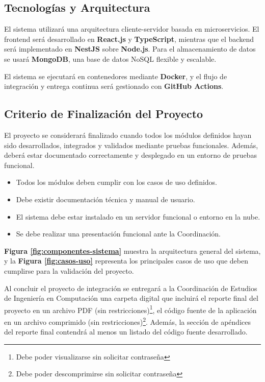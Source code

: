\subsection{Tecnologías y Arquitectura}

El sistema utilizará una arquitectura cliente-servidor basada en microservicios. El frontend será desarrollado en \textbf{React.js} y \textbf{TypeScript}, mientras que el backend será implementado en \textbf{NestJS} sobre \textbf{Node.js}. Para el almacenamiento de datos se usará \textbf{MongoDB}, una base de datos NoSQL flexible y escalable.

El sistema se ejecutará en contenedores mediante \textbf{Docker}, y el flujo de integración y entrega continua será gestionado con \textbf{GitHub Actions}.

\subsection{Criterio de Finalización del Proyecto}

El proyecto se considerará finalizado cuando todos los módulos definidos hayan sido desarrollados, integrados y validados mediante pruebas funcionales. Además, deberá estar documentado correctamente y desplegado en un entorno de pruebas funcional.

\begin{itemize}
	\item Todos los módulos deben cumplir con los casos de uso definidos.
	\item Debe existir documentación técnica y manual de usuario.
	\item El sistema debe estar instalado en un servidor funcional o entorno en la nube.
	\item Se debe realizar una presentación funcional ante la Coordinación.
\end{itemize}

\textbf{Figura \ref{fig:componentes-sistema}} muestra la arquitectura general del sistema, y la \textbf{Figura \ref{fig:casos-uso}} representa los principales casos de uso que deben cumplirse para la validación del proyecto.

\vspace{0.5cm}

Al concluir el proyecto de integración se entregará a la Coordinación de Estudios de Ingeniería en Computación una carpeta digital que incluirá el reporte final del proyecto en un archivo PDF (sin restricciones)\footnote{Debe poder visualizarse sin solicitar contraseña}, el código fuente de la aplicación en un archivo comprimido (sin restricciones)\footnote{Debe poder descomprimirse sin solicitar contraseña}. Además, la sección de apéndices del reporte final contendrá al menos un listado del código fuente desarrollado.

